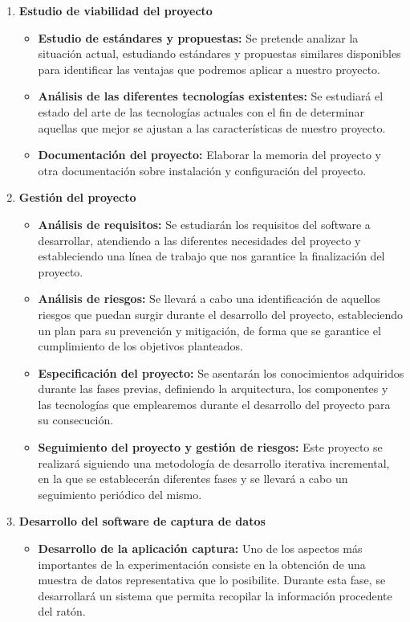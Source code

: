 \begin{enumerate}[noitemsep]
    \item \textbf{Estudio de viabilidad del proyecto}
    \begin{itemize}
        \item \textbf{Estudio de estándares y propuestas:} Se pretende analizar la situación actual, estudiando estándares y propuestas  similares disponibles para identificar las ventajas que podremos aplicar a nuestro proyecto.
        \item \textbf{Análisis de las diferentes tecnologías existentes:} Se estudiará el estado del arte de las tecnologías actuales con el fin de determinar aquellas que mejor se ajustan a las características de nuestro proyecto.
        \item \textbf{Documentación del proyecto:} Elaborar la memoria del proyecto y otra documentación sobre instalación y configuración del proyecto.
    \end{itemize}
    \item \textbf{Gestión del proyecto}
    \begin{itemize}
        \item \textbf{Análisis de requisitos:} Se estudiarán los requisitos del software a desarrollar, atendiendo a las diferentes necesidades del proyecto y estableciendo una línea de trabajo que nos garantice la finalización del proyecto.
        \item \textbf{Análisis de riesgos:} Se llevará a cabo una identificación de aquellos riesgos que puedan surgir durante el desarrollo del proyecto, estableciendo un plan para su prevención y mitigación, de forma que se garantice el cumplimiento de los objetivos planteados.
        \item \textbf{Especificación del proyecto:} Se asentarán los conocimientos adquiridos durante las fases previas, definiendo la arquitectura, los componentes y las tecnologías que emplearemos durante el desarrollo del proyecto para su consecución.
        \item \textbf{Seguimiento del proyecto y gestión de riesgos:} Este proyecto se realizará siguiendo una metodología de desarrollo iterativa incremental, en la que se establecerán diferentes fases y se llevará a cabo un seguimiento periódico del mismo.
    \end{itemize}
    \item \textbf{Desarrollo del software de captura de datos}
    \begin{itemize}
        \item \textbf{Desarrollo de la aplicación captura:} Uno de los aspectos más importantes de la experimentación consiste en la obtención de una muestra de datos representativa que lo posibilite. Durante esta fase, se desarrollará un sistema que permita recopilar la información procedente del ratón.

\end{itemize}
\end{enumerate}

